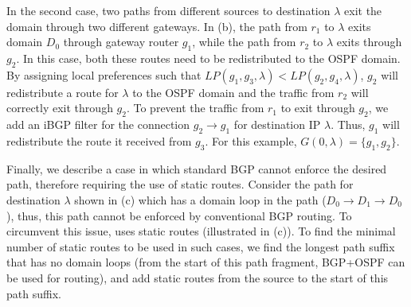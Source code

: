 In the second case, two paths from different sources to
destination $\lambda$ exit
the domain through two different
gateways. In (b),
the path from $r_1$ to $\lambda$ exits domain $D_0$ through 
gateway router $g_1$, while the path from $r_2$  to $\lambda$ exits 
through $g_2$. 
In this case, both these routes need to be  
redistributed to the OSPF domain. 
By assigning local preferences such that
$LP(g_1,g_3,\lambda)<LP(g_2,g_4,\lambda)$,
 $g_2$ will redistribute a route for $\lambda$ 
 to the OSPF domain and
the traffic from $r_2$ will correctly exit through $g_2$. 
To prevent the traffic from $r_1$ to exit through $g_2$,
we add an iBGP filter
 for the connection $g_2 \rightarrow g_1$ for
destination IP $\lambda$. 
Thus, $g_1$ will 
redistribute the route it received from $g_3$. For 
this example, $G(0, \lambda) = \{g_1, g_2\}$. 

Finally, we describe a case in which standard BGP cannot enforce
the desired path, therefore requiring the use of static routes.
Consider the path for destination $\lambda$ 
shown in (c) which has a domain loop in the path
($D_0 \rightarrow D_1 \rightarrow D_0$), thus, this path cannot be
enforced by conventional BGP routing.
To circumvent this issue, \name uses static routes 
(illustrated in (c)). 
To find the minimal number of static routes to be used in
such cases, we find the longest path suffix that has
no domain loops (from the start of this path fragment, 
BGP+OSPF can be used for routing), 
and add static routes from the source to the start of this path suffix.
 



